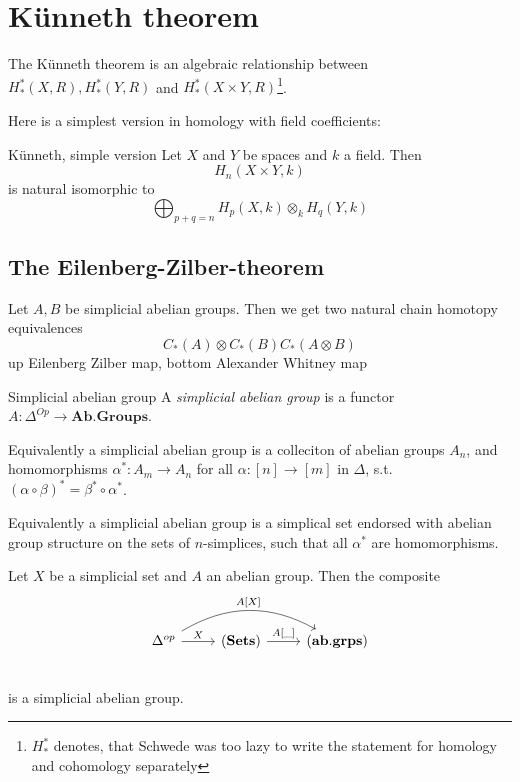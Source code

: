 \documentclass[language=english]{TemplateLecture}
\begin{document}
\section{Künneth theorem}
The Künneth theorem is an algebraic relationship between \(H^*_*(X,R), H^*_*(Y,R)\) and \(H^*_*(X\times Y, R)\)\footnote{\(H_*^*\) denotes, that Schwede was too lazy to write the statement for homology and cohomology separately}.

Here is a simplest version in homology with field coefficients:
\begin{thm}{Künneth, simple version}{}
    Let \(X\) and \(Y\) be spaces and \(k\) a field. Then
    \[H_n(X\times Y, k)\]
    is natural isomorphic to
    \[\bigoplus_{p+q = n} H_p(X,k) \otimes_k H_q(Y,k)\]
\end{thm}

\subsection{The Eilenberg-Zilber-theorem}

Let \(A,B\) be simplicial abelian groups. Then we get two natural chain homotopy equivalences
\[C_*(A) \otimes C_*(B) C_*(A\otimes B)\]
up Eilenberg Zilber map, bottom Alexander Whitney map %

\begin{defi}{Simplicial abelian group}{}
    A \emph{simplicial abelian group}  is a functor \(A\colon \Delta^{Op} \to \mathbf{Ab.Groups}\).
\end{defi}

\begin{remark}
    Equivalently a simplicial abelian group is a colleciton of abelian groups \(A_n\), and homomorphisms \(\alpha^*\colon A_m \to A_n\) for all \(\alpha\colon [n] \to [m]\) in \(\Delta\), s.t. \((\alpha\circ \beta)^* = \beta^* \circ \alpha^*\).

    Equivalently a simplicial abelian group is a simplical set endorsed with abelian group structure on the sets of \(n\)-simplices, such that all \(\alpha^*\) are homomorphisms.
\end{remark}


\begin{example}
    Let \(X\) be a simplicial set and \(A\) an abelian group. Then the composite
    \[\begin{tikzcd}
        \Delta^{op} \ar[rr, bend left, "{A[X]}"]\ar[r, "X"] & (\mathbf{Sets}) \ar[r, "{{A[\_]}}"] & (\mathbf{ab.grps}) \\
    \end{tikzcd}\]
    is a simplicial abelian group.
\end{example}
\end{document}
